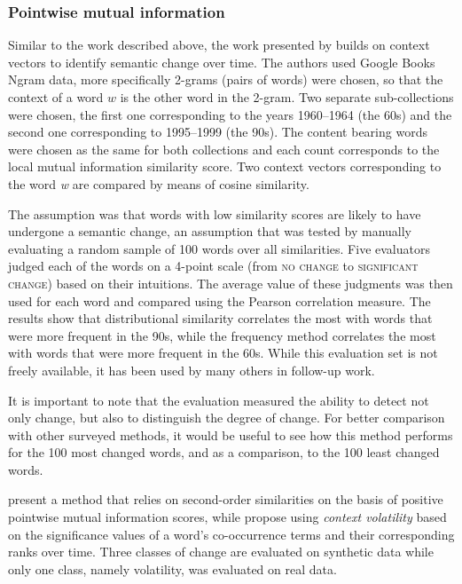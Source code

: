 \documentclass[output=paper]{langsci/langscibook}
\begin{document}
\subsubsection{Pointwise mutual information}\largerpage

Similar to the work described above, the work presented by \citet{gulordava-baroni-2011-distributional} builds on context vectors to identify semantic change over time. The authors used Google Books Ngram data, more specifically 2-grams (pairs of words) were chosen, so that the context of a word $w$ is the other word in the 2-gram. 
Two separate sub-collections were chosen, the first one corresponding to the years 1960--1964 (the 60s) and the second one corresponding to 1995--1999 (the 90s). The content bearing words were chosen as the same for both collections and each count corresponds to the local mutual information similarity score. Two context vectors corresponding to the word \textit{w} are compared by means of cosine similarity. 

The assumption was that words with low similarity scores are likely to have undergone a semantic change, an assumption that was tested by manually evaluating a random sample of 100 words over all similarities. Five evaluators judged each of the words on a 4-point scale (from \textsc{no change} to \textsc{significant change}) based on their intuitions. The average value of these judgments was then used for each word and compared using the Pearson correlation measure.
The results show that distributional similarity correlates the most  
with words that were more frequent in the 90s, while the frequency method correlates the most 
with words that were more frequent in the 60s. While this evaluation set is not freely available, it has been used by many others in follow-up work.

It is important to note that the evaluation measured the ability to detect not only change, but also to distinguish the degree of change. For better comparison with other surveyed methods, it would be useful to see how this method performs for the 100 most changed words, and as a comparison, to the 100 least changed words. 
%

\citet{rodda2016,rodda2016panta-journal} present a method that 
relies on second-order similarities on the basis of positive pointwise mutual information scores, while \citet{kahmannnh17} propose using \emph{context volatility} based on the significance values of a word's co-occurrence terms and their corresponding ranks over time. Three classes of change are evaluated on synthetic data while only one class, namely volatility, was evaluated on real data. 
\end{document}
